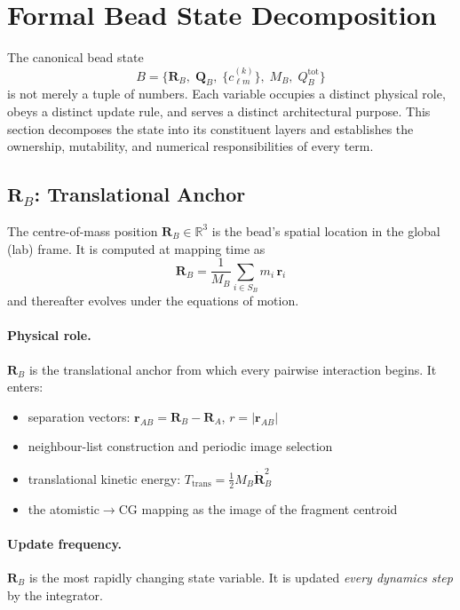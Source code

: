 \documentclass[11pt]{article}
\begin{document}
\section{Formal Bead State Decomposition}

The canonical bead state
\begin{equation}
    B = \bigl\{ \mathbf{R}_B,\; \mathbf{Q}_B,\; \{c_{\ell m}^{(k)}\},\; M_B,\; Q_B^{\mathrm{tot}} \bigr\}
\end{equation}
is not merely a tuple of numbers.  Each variable occupies a distinct physical
role, obeys a distinct update rule, and serves a distinct architectural
purpose.  This section decomposes the state into its constituent layers
and establishes the ownership, mutability, and numerical responsibilities
of every term.

\subsection{$\mathbf{R}_B$: Translational Anchor}

The centre-of-mass position $\mathbf{R}_B \in \mathbb{R}^3$ is the bead's
spatial location in the global (lab) frame.  It is computed at mapping time as
\begin{equation}
    \mathbf{R}_B = \frac{1}{M_B} \sum_{i \in S_B} m_i \,\mathbf{r}_i
\end{equation}
and thereafter evolves under the equations of motion.

\paragraph{Physical role.}
$\mathbf{R}_B$ is the translational anchor from which every pairwise
interaction begins.  It enters:
\begin{itemize}
    \item separation vectors: $\mathbf{r}_{AB} = \mathbf{R}_B - \mathbf{R}_A$,
          $r = |\mathbf{r}_{AB}|$
    \item neighbour-list construction and periodic image selection
    \item translational kinetic energy:
          $T_{\mathrm{trans}} = \tfrac{1}{2} M_B \dot{\mathbf{R}}_B^2$
    \item the atomistic$\to$CG mapping as the image of the fragment centroid
\end{itemize}

\paragraph{Update frequency.}
$\mathbf{R}_B$ is the most rapidly changing state variable.  It is updated
\emph{every dynamics step} by the integrator.
\end{document}
